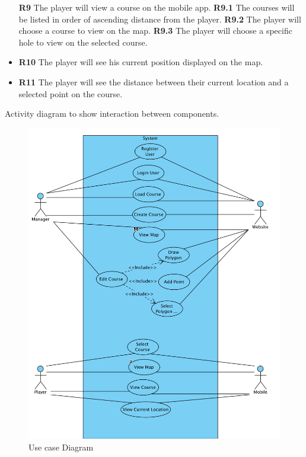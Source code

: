 \documentclass{article}
\begin{document}
\begin{itemize}
            \textbf{R9} The player will view a course on the mobile app.
            \subitem \textbf{R9.1} The courses will be listed in order of
            ascending distance from the player.
            \subitem \textbf{R9.2} The player will choose a course to view on
            the map.
            \subitem \textbf{R9.3} The player will choose a specific hole to
            view on the selected course.
        \item
            \textbf{R10} The player will see his current position displayed on
            the map.
        \item
            \textbf{R11} The player will see the distance between their current
            location and a selected point on the course.
    \end{itemize}
    
    Activity diagram to show interaction between components.

    \begin{figure}[h]
    \centering
    \includegraphics[scale=0.6]{UsecaseDiagram}
    \caption{Use case Diagram}
    \label{fig:usecase}
    \end{figure}
\end{document}
